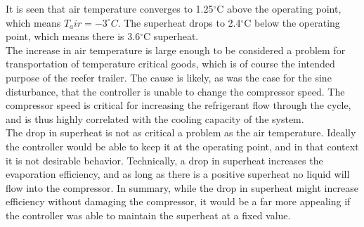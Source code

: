 It is seen that air temperature converges to 1.25$^{\circ}$C above the operating point, which means $T_air = -3^{\circ}C$. The superheat drops to 2.4$^{\circ}$C below the operating point, which means there is 3.6$^{\circ}$C superheat.\\

The increase in air temperature is large enough to be considered a problem for transportation of temperature critical goods, which is of course the intended purpose of the reefer trailer. The cause is likely, as was the case for the sine disturbance, that the controller is unable to change the compressor speed. The compressor speed is critical for increasing the refrigerant flow through the cycle, and is thus highly correlated with the cooling capacity of the system. \\

The drop in superheat is not as critical a problem as the air temperature. Ideally the controller would be able to keep it at the operating point, and in that context it is not desirable behavior. Technically, a drop in superheat increases the evaporation efficiency, and as long as there is a positive superheat no liquid will flow into the compressor. In summary, while the drop in superheat might increase efficiency without damaging the compressor, it would be a far more appealing if the controller was able to maintain the superheat at a fixed value.

